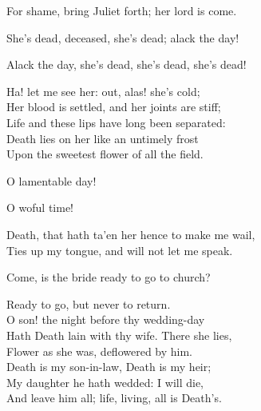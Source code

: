 \begin{speech}
For shame, bring Juliet forth; her lord is come. \\

\end{speech}
\begin{speech}
She's dead, deceased, she's dead; alack the day!
\\
\end{speech}
\begin{speech}
Alack the day, she's dead, she's dead, she's dead!
\\
\end{speech}
\begin{speech}
Ha! let me see her: out, alas! she's cold; \\
Her blood is settled, and her joints are stiff; \\
Life and these lips have long been separated: \\
Death lies on her like an untimely frost \\
Upon the sweetest flower of all the field. \\
\end{speech}
\begin{speech}
O lamentable day! \\
\end{speech}
\begin{speech}
O woful time! \\
\end{speech}
\begin{speech}
Death, that hath ta'en her hence to make me wail,
\\
Ties up my tongue, and will not let me speak. 
\\
\end{speech}
\begin{speech}
Come, is the bride ready to go to church? \\
\end{speech}
\begin{speech}
Ready to go, but never to return. \\
O son! the night before thy wedding-day \\
Hath Death lain with thy wife.   There she lies, \\
Flower as she was, deflowered by him. \\
Death is my son-in-law, Death is my heir; \\
My daughter he hath wedded: I will die, \\
And leave him all; life, living, all is Death's. \\
\end{speech}
